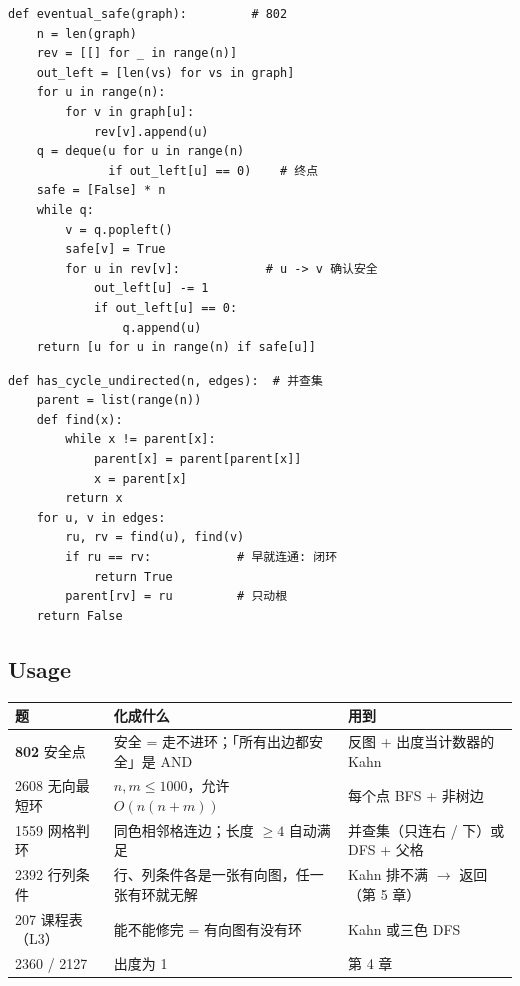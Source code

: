 \begin{minipage}[t]{0.49\linewidth}
\begin{lstlisting}
def eventual_safe(graph):         # 802
    n = len(graph)
    rev = [[] for _ in range(n)]
    out_left = [len(vs) for vs in graph]
    for u in range(n):
        for v in graph[u]:
            rev[v].append(u)
    q = deque(u for u in range(n)
              if out_left[u] == 0)    # 终点
    safe = [False] * n
    while q:
        v = q.popleft()
        safe[v] = True
        for u in rev[v]:            # u -> v 确认安全
            out_left[u] -= 1
            if out_left[u] == 0:
                q.append(u)
    return [u for u in range(n) if safe[u]]
\end{lstlisting}
\end{minipage}\hfill
\begin{minipage}[t]{0.49\linewidth}
\begin{lstlisting}
def has_cycle_undirected(n, edges):  # 并查集
    parent = list(range(n))
    def find(x):
        while x != parent[x]:
            parent[x] = parent[parent[x]]
            x = parent[x]
        return x
    for u, v in edges:
        ru, rv = find(u), find(v)
        if ru == rv:            # 早就连通: 闭环
            return True
        parent[rv] = ru         # 只动根
    return False
\end{lstlisting}
\end{minipage}

\subsection{Usage}

\begin{tabularx}{\linewidth}{@{}l X l@{}}
\toprule
\textbf{题} & \textbf{化成什么} & \textbf{用到}\\
\midrule
\textbf{802} 安全点 & 安全 = 走不进环；「所有出边都安全」是 AND & 反图 + 出度当计数器的 Kahn\\
2608 无向最短环 & $n, m \le 1000$，允许 $O(n(n+m))$ & 每个点 BFS + 非树边\\
1559 网格判环 & 同色相邻格连边；长度 $\ge 4$ 自动满足 & 并查集（只连右 / 下）或 DFS + 父格\\
2392 行列条件 & 行、列条件各是一张有向图，任一张有环就无解 & Kahn 排不满 $\to$ 返回 \code{[]}（第 5 章）\\
207 课程表（L3） & 能不能修完 = 有向图有没有环 & Kahn 或三色 DFS\\
2360 / 2127 & 出度为 1 & 第 4 章\\
\bottomrule
\end{tabularx}

